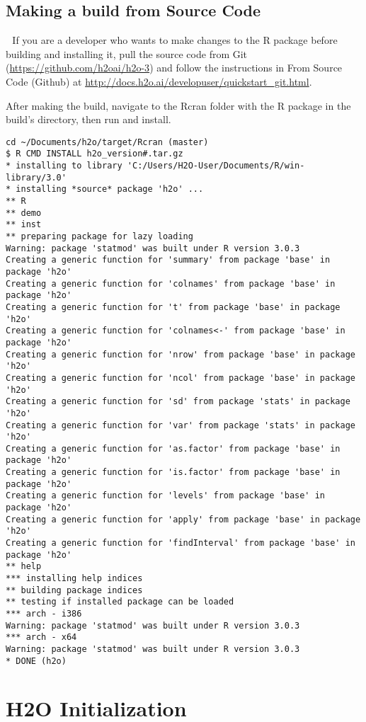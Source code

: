 \subsection{Making a build from Source Code} 
If you are a developer who wants to make changes to the R package before building and installing it, pull the source code from Git (\url{https://github.com/h2oai/h2o-3}) and follow the instructions in From Source Code (Github) at {\url{http://docs.h2o.ai/developuser/quickstart\_git.html}}.

After making the build, navigate to the Rcran folder with the R package in the build’s directory, then run and install.
\begin{lstlisting}[style=R]
 cd ~/Documents/h2o/target/Rcran (master)
$ R CMD INSTALL h2o_version#.tar.gz
* installing to library 'C:/Users/H2O-User/Documents/R/win-library/3.0'
* installing *source* package 'h2o' ...
** R
** demo
** inst
** preparing package for lazy loading
Warning: package 'statmod' was built under R version 3.0.3
Creating a generic function for 'summary' from package 'base' in package 'h2o'
Creating a generic function for 'colnames' from package 'base' in package 'h2o'
Creating a generic function for 't' from package 'base' in package 'h2o'
Creating a generic function for 'colnames<-' from package 'base' in package 'h2o'
Creating a generic function for 'nrow' from package 'base' in package 'h2o'
Creating a generic function for 'ncol' from package 'base' in package 'h2o'
Creating a generic function for 'sd' from package 'stats' in package 'h2o'
Creating a generic function for 'var' from package 'stats' in package 'h2o'
Creating a generic function for 'as.factor' from package 'base' in package 'h2o'
Creating a generic function for 'is.factor' from package 'base' in package 'h2o'
Creating a generic function for 'levels' from package 'base' in package 'h2o'
Creating a generic function for 'apply' from package 'base' in package 'h2o'
Creating a generic function for 'findInterval' from package 'base' in package 'h2o'
** help
*** installing help indices
** building package indices
** testing if installed package can be loaded
*** arch - i386
Warning: package 'statmod' was built under R version 3.0.3
*** arch - x64
Warning: package 'statmod' was built under R version 3.0.3
* DONE (h2o)
\end{lstlisting}


\section{H2O Initialization}

